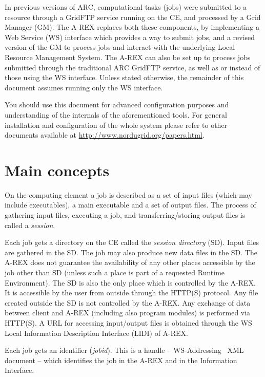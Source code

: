 \documentclass{article}                            %
\begin{document}
In previous versions of ARC, computational tasks (jobs) were submitted
to a resource through a GridFTP service running on the CE, and
processed by a Grid Manager (GM). The A-REX replaces both these
components, by implementing a Web Service (WS) interface which
provides a way to submit jobs, and a revised version of the GM to
process jobs and interact with the underlying Local Resource
Management System. The A-REX can also be set up to process jobs
submitted through the traditional ARC GridFTP service, as well as or
instead of those using the WS interface. Unless stated otherwise, the
remainder of this document assumes running only the WS interface.

\begin{framed}You should use this document for advanced configuration purposes
and understanding of the internals of the aforementioned tools. For
general installation and configuration of the whole system please
refer to other documents available at
\url{http://www.nordugrid.org/papers.html}.
\end{framed}

\section{Main concepts\label{sec:main concepts}}

On the computing element a job is described as a set of input files
(which may include executables), a main executable and a set of output
files. The process of gathering input files, executing a job, and
transferring/storing output files is called a \emph{session}.

Each job gets a directory on the CE called the \emph{session
directory} (SD). Input files are gathered in the SD. The job may
also produce new data files in the SD. The A-REX does not guarantee
the availability of any other places accessible by the job other than
SD (unless such a place is part of a requested Runtime Environment).
The SD is also the only place which is controlled by the A-REX. It is
accessible by the user from outside through the HTTP(S) protocol.  Any
file created outside the SD is not controlled by the A-REX. Any
exchange of data between client and A-REX (including also program
modules) is performed via HTTP(S). A URL for accessing input/output
files is obtained through the WS Local Information Description
Interface (LIDI) of A-REX.

Each job gets an identifier (\textit{jobid}). This is a handle --
WS-Addressing~\cite{ws-addr-soap} XML document -- which identifies the
job in the A-REX and in the Information Interface.
\end{document}
